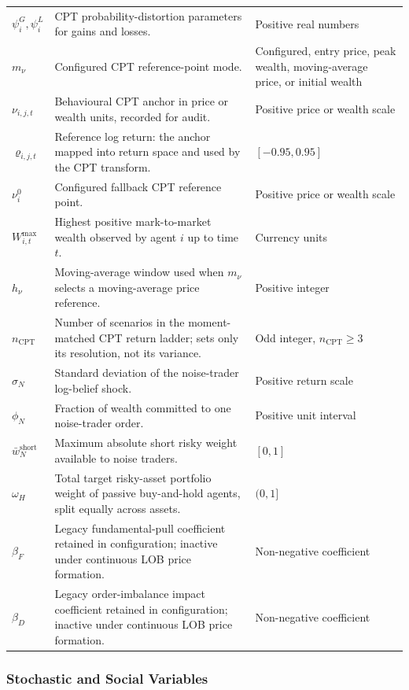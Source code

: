 \documentclass[12pt, a4paper]{article}
\begin{document}
\begin{longtable}{@{}L{0.22\textwidth}L{0.50\textwidth}L{0.20\textwidth}@{}}
        \(\psi_i^G,\psi_i^L\) & CPT probability-distortion parameters for gains and losses. & Positive real numbers \\
        \(m_{\nu}\) & Configured CPT reference-point mode. & Configured, entry price, peak wealth, moving-average price, or initial wealth \\
        \(\nu_{i,j,t}\) & Behavioural CPT anchor in price or wealth units, recorded for audit. & Positive price or wealth scale \\
        \(\varrho_{i,j,t}\) & Reference log return: the anchor mapped into return space and used by the CPT transform. & \([-0.95,0.95]\) \\
        \(\nu_i^0\) & Configured fallback CPT reference point. & Positive price or wealth scale \\
        \(W_{i,t}^{\max}\) & Highest positive mark-to-market wealth observed by agent \(i\) up to time \(t\). & Currency units \\
        \(h_{\nu}\) & Moving-average window used when \(m_{\nu}\) selects a moving-average price reference. & Positive integer \\
        \(n_{\mathrm{CPT}}\) & Number of scenarios in the moment-matched CPT return ladder; sets only its resolution, not its variance. & Odd integer, \(n_{\mathrm{CPT}}\ge3\) \\
        \(\sigma_N\) & Standard deviation of the noise-trader log-belief shock. & Positive return scale \\
        \(\phi_N\) & Fraction of wealth committed to one noise-trader order. & Positive unit interval \\
        \(\bar w_N^{\text{short}}\) & Maximum absolute short risky weight available to noise traders. & \([0,1]\) \\
        \(\omega_H\) & Total target risky-asset portfolio weight of passive buy-and-hold agents, split equally across assets. & \((0,1]\) \\
        \(\beta_F\) & Legacy fundamental-pull coefficient retained in configuration; inactive under continuous LOB price formation. & Non-negative coefficient \\
        \(\beta_D\) & Legacy order-imbalance impact coefficient retained in configuration; inactive under continuous LOB price formation. & Non-negative coefficient \\
        \bottomrule
    \end{longtable}

    \subsubsection*{Stochastic and Social Variables}
\end{document}
